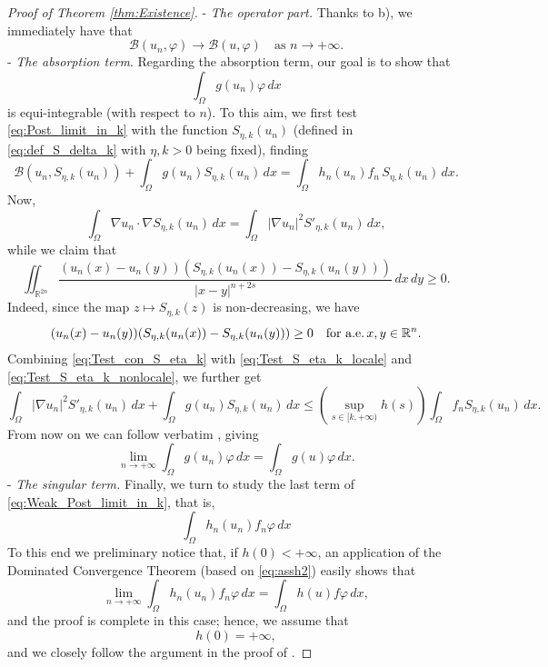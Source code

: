 \documentclass[11pt,a4paper]{amsart}
\theoremstyle{definition}
\theoremstyle{plain}
\numberwithin{equation}{section}
\begin{document}
{\begin{proof}[Proof of Theorem \ref{thm:Existence}]
\noindent-\,\,\emph{The operator part.}
Thanks to {\rm b)}, we immediately have that 
\begin{equation} \label{eq:operatorTerm}
\mathcal{B}(u_n,\varphi) \to \mathcal{B}(u,\varphi) \quad \textrm{as } n \to +\infty.
\end{equation}
-\,\,\emph{The absorption term}.
Regarding the absorption term, our goal is to show that
$$\int_{\Omega}g(u_n)\varphi\,dx$$
\noindent is equi-integrable (with respect to $n$). To this aim, we first test \eqref{eq:Post_limit_in_k} with the function $S_{\eta,k}(u_n)$ (defined in \eqref{eq:def_S_delta_k} with $\eta, k>0$ being fixed), finding
\begin{equation}\label{eq:Test_con_S_eta_k}
	\mathcal{B}(u_n,S_{\eta,k}(u_n)) + \int_{\Omega}g(u_n)S_{\eta,k}(u_n)\,dx = \int_{\Omega}h_n(u_n)f_n \, S_{\eta,k}(u_n)\,dx.
\end{equation}
Now,
\begin{equation}\label{eq:Test_S_eta_k_locale}
	\int_{\Omega}\nabla u_n \cdot \nabla S_{\eta,k}(u_n)\,dx = \int_{\Omega}|\nabla u_n|^2 S'_{\eta,k}(u_n)\,dx,
\end{equation}
\noindent while we claim that
\begin{equation}\label{eq:Test_S_eta_k_nonlocale}
	\iint_{\mathbb{R}^{2n}}\dfrac{(u_n(x)-u_n(y))(S_{\eta,k}(u_n(x))-S_{\eta,k}(u_n(y)))}{|x-y|^{n+2s}}\,dx\,dy \geq 0.
\end{equation}
Indeed, since the map $z\mapsto S_{\eta,k}(z)$ is non-dec\-reasing, we have
\begin{equation*}
	(u_n(x)-u_n(y))(S_{\eta,k}(u_n(x))-S_{\eta,k}(u_n(y))) \geq 0\quad\text{for a.e.\,$x,y\in\mathbb{R}^n$}.
\end{equation*}
Combining \eqref{eq:Test_con_S_eta_k} with \eqref{eq:Test_S_eta_k_locale} and \eqref{eq:Test_S_eta_k_nonlocale}, we further get
\begin{equation*}
	\int_{\Omega}|\nabla u_n|^2 S'_{\eta,k}(u_n)\,dx + \int_{\Omega}g(u_n)S_{\eta,k}(u_n)\,dx \leq (\sup_{s\in [k,+\infty)}h(s))\int_{\Omega}f_n S_{\eta,k}(u_n)\,dx.
\end{equation*}
From now on we can follow verbatim \cite[Proof of Theorem 3.4]{Oliva}, giving
\begin{equation} \label{eq:AbsorTerm}
\lim_{n\to+\infty}\int_\Omega g(u_n)\varphi\,dx = \int_{\Omega} g(u)\varphi\,dx.
\end{equation}
\noindent-\,\,\emph{The singular term.}
Finally, we turn to study the last term of \eqref{eq:Weak_Post_limit_in_k}, that is,
$$\int_{\Omega}h_n(u_n)f_n \varphi\,dx$$
To this end we preliminary notice that, if $h(0)<+\infty$, an application
of the Dominated Convergence Theorem (based on \eqref{eq:assh2}) easily shows that
$$\lim_{n\to+\infty}\int_{\Omega}h_n(u_n)f_n \varphi\,dx = \int_{\Omega}h(u)f \varphi\,dx,$$
and the proof is complete in this case; hence, we assume that
\begin{equation} \label{eq:assumptionSingular}
 h(0) = +\infty,
\end{equation}
and we closely follow the argument in the proof
of \cite[Theorem 3.4]{Oliva}. 


\end{proof}}
\end{document}
